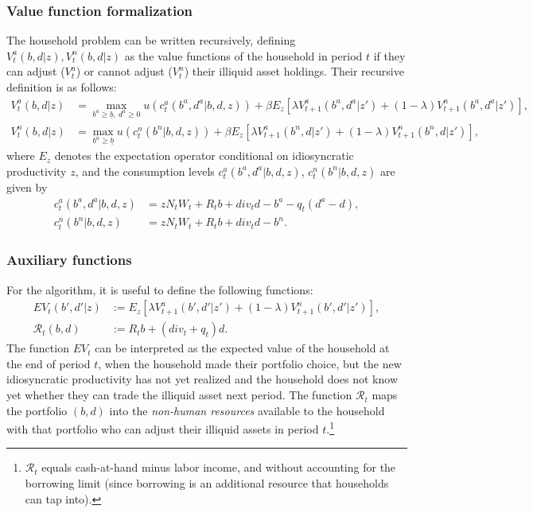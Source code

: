 \documentclass[11pt]{article} %
\begin{document}
\subsubsection{Value function formalization}
The household problem can be written recursively, defining $V^a_t(b,d|z),V^n_t(b,d|z)$ as the value functions of the household in period $t$ if they can adjust ($V^a_t$) or cannot adjust ($V^n_t$) their illiquid asset holdings. Their recursive definition is as follows:
\begin{align}
V^a_t(b,d|z) &= \max_{b^a\geq\underline{b},\:d^a\geq 0} u(c^a_t(b^a,d^a|b,d,z)) + \beta E_z \left[ \lambda V^a_{t+1}(b^a,d^a|z') + (1-\lambda) V^n_{t+1}(b^a,d^a|z') \right], \\
V^n_t(b,d|z) &= \max_{b^n\geq\underline{b}} u(c^n_t(b^n|b,d,z)) + \beta E_z \left[ \lambda V^a_{t+1}(b^n,d|z') + (1-\lambda) V^n_{t+1}(b^n,d|z') \right],
\end{align}
where $E_z$ denotes the expectation operator conditional on idiosyncratic productivity $z$, and the consumption levels $c^a_t(b^a,d^a|b,d,z)$, $c^n_t(b^n|b,d,z)$ are given by
\begin{align}
c^a_t(b^a,d^a|b,d,z) &= zN_tW_t + R_t b + div_t d - b^a - q_t(d^a-d),\\
c^n_t(b^n|b,d,z) &= zN_tW_t + R_t b + div_t d - b^n.\label{eq:c_n}
\end{align}
\subsubsection{Auxiliary functions}
For the algorithm, it is useful to define the following functions:
\begin{align}
EV_t(b',d'|z) &:= E_z\left[ \lambda V^a_{t+1}(b',d'|z') + (1-\lambda)V^n_{t+1}(b',d'|z') \right], \label{eq:EVdef}\\
\mathcal{R}_t(b,d) &:= R_t b + (div_t+q_t) d.\label{eq:resdef}
\end{align}
The function $EV_t$ can be interpreted as the expected value of the household at the end of period $t$, when the household made their portfolio choice, but the new idiosyncratic productivity has not yet realized and the household does not know yet whether they can trade the illiquid asset next period. The function $\mathcal{R}_t$ maps the portfolio $(b,d)$ into the \textit{non-human resources} available to the household with that portfolio who can adjust their illiquid assets in period $t$.\footnote{$\mathcal{R}_t$ equals cash-at-hand minus labor income, and without accounting for the borrowing limit (since borrowing is an additional resource that households can tap into).}
\end{document}
